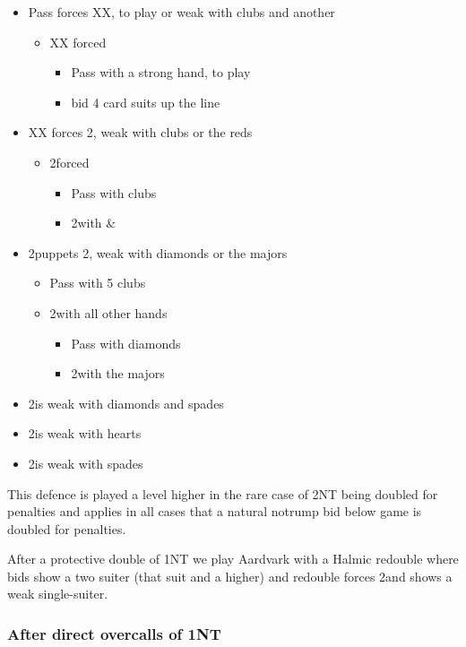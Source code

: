 \documentclass[a4paper,14pt]{extarticle}
\begin{document}
\begin{itemize}
\item Pass forces XX, to play or weak with clubs and another
	\begin{itemize}
	\item XX forced
		\begin{itemize}
		\item Pass with a strong hand, to play
		\item bid 4 card suits up the line
		\end{itemize}
	\end{itemize}
\item XX forces 2\clubs, weak with clubs or the reds
	\begin{itemize}
	\item 2\clubs forced
		\begin{itemize}
		\item Pass with clubs
		\item 2\diamonds with \diamonds\&\hearts
		\end{itemize}
	\end{itemize}
\item 2\clubs puppets 2\diamonds, weak with diamonds or the majors
	\begin{itemize}
	\item Pass with 5 clubs
	\item 2\diamonds with all other hands
		\begin{itemize}
		\item Pass with diamonds
		\item 2\hearts with the majors
		\end{itemize}
	\end{itemize}
\item 2\diamonds is weak with diamonds and spades
\item 2\hearts is weak with hearts
\item 2\spades is weak with spades
\end{itemize}

This defence is played a level higher in the rare case of 2NT being doubled for
penalties and applies in all cases that a natural notrump bid below game is doubled for
penalties.

\label{note:21}

After a protective double of 1NT we play Aardvark with a Halmic redouble where
bids show a two suiter (that suit and a higher) and redouble forces 2\clubs and shows a weak single-suiter.

\subsubsection{After direct overcalls of 1NT}
\label{sec:resp:lebensohl}
\label{note:13}
\end{document}
